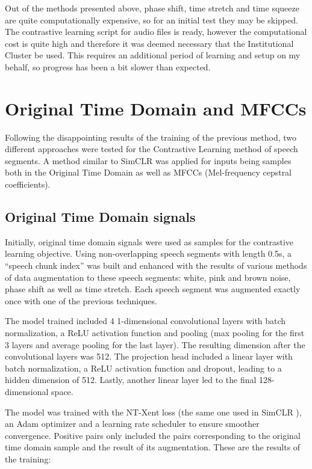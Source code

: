 \documentclass[12pt]{article}
\begin{document}
Out of the methods presented above, phase shift, time stretch and time squeeze are quite computationally expensive, so for an initial test they may be skipped. The contrastive learning script for audio files is ready, however the computational cost is quite high and therefore it was deemed necessary that the Institutional Cluster be used. This requires an additional period of learning and setup on my behalf, so progress has been a bit slower than expected.

\section{Original Time Domain and MFCCs}

Following the disappointing results of the training of the previous method, two different approaches were tested for the Contrastive Learning method of speech segments. A method similar to SimCLR \cite{SimCLR} was applied for inputs being samples both in the Original Time Domain as well as MFCCs (Mel-frequency cepstral coefficients). 

\subsection{Original Time Domain signals}

Initially, original time domain signals were used as samples for the contrastive learning objective. Using non-overlapping speech segments with length 0.5s, a ``speech chunk index'' was built and enhanced with the results of various methods of data augmentation to these speech segments: white, pink and brown noise, phase shift as well as time stretch. Each speech segment was augmented exactly once with one of the previous techniques. 

The model trained included 4 1-dimensional convolutional layers with batch normalization, a ReLU activation function and pooling (max pooling for the first 3 layers and average pooling for the last layer). The resulting dimension after the convolutional layers was 512. The projection head included a linear layer with batch normalization, a ReLU activation function and dropout, leading to a hidden dimension of 512. Lastly, another linear layer led to the final 128-dimensional space.

The model was trained with the NT-Xent loss (the same one used in SimCLR \cite{SimCLR}), an Adam optimizer and a learning rate scheduler to ensure smoother convergence. Positive pairs only included the pairs corresponding to the original time domain sample and the result of its augmentation. These are the results of the training:
\end{document}
